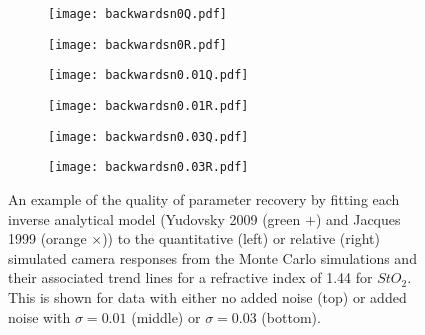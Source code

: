 \begin{figure}[h!]
    \centering
    \begin{subfigure}{0.49\textwidth}
        \texttt{[image: backwardsn0Q.pdf]}
        \caption{}
        \label{fig:backwardsn0Q}
    \end{subfigure}
    \begin{subfigure}{0.49\textwidth}
        \texttt{[image: backwardsn0R.pdf]}
        \caption{}
        \label{fig:backwardsn0R}
    \end{subfigure}
    \begin{subfigure}{0.49\textwidth}
        \texttt{[image: backwardsn0.01Q.pdf]}
        \caption{}
        \label{fig:backwardsn0.01Q}
    \end{subfigure}
    \begin{subfigure}{0.49\textwidth}
        \texttt{[image: backwardsn0.01R.pdf]}
        \caption{}
        \label{fig:backwardsm0.01R}
    \end{subfigure}
    \begin{subfigure}{0.49\textwidth}
        \texttt{[image: backwardsn0.03Q.pdf]}
        \caption{}
        \label{fig:backwardsn0.03Q}
    \end{subfigure}
    \begin{subfigure}{0.49\textwidth}
        \texttt{[image: backwardsn0.03R.pdf]}
        \caption{}
        \label{fig:backwardsm0.03R}
    \end{subfigure}
    \caption{An example of the quality of parameter recovery by fitting each inverse analytical model (Yudovsky 2009 (\textcolor{MyGreen}{green $+$}) and Jacques 1999 (\textcolor{MyOrange}{orange $\times$})) to the quantitative (left) or relative (right) simulated camera responses from the Monte Carlo simulations and their associated trend lines for a refractive index of 1.44 for $StO_2$. This is shown for data with either no added noise (top) or added noise with $\sigma = 0.01$ (middle) or $\sigma = 0.03$ (bottom).}
    \label{fig:backwardsHSIMC1}
\end{figure}

